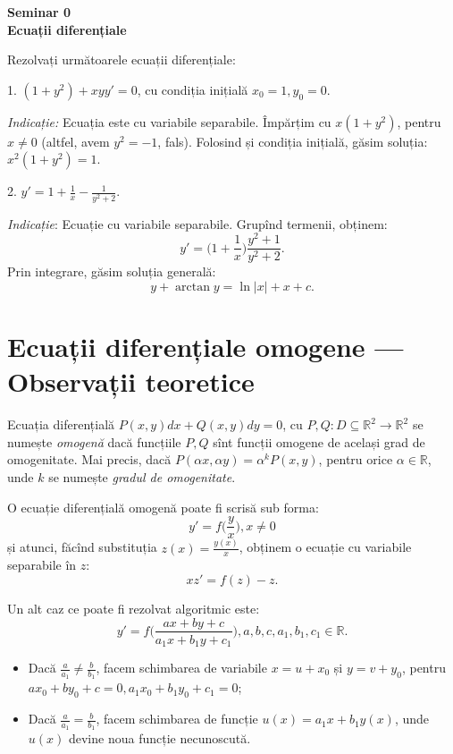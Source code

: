 \documentclass[11pt,a4paper]{article}
\newcommand\seq{\subseteq}
\newcommand\RR{\mathbb{R}}
\theoremstyle{dotless}
\theoremstyle{dotlessdr}
\begin{document}

\begin{center}
  {\large\textbf{Seminar 0 \\ Ecuații diferențiale}}
\end{center}

\vspace{2cm}

Rezolvați următoarele ecuații diferențiale:

1. $(1 + y^2) + xyy' = 0$, cu condiția inițială $x_0 = 1, y_0 = 0$.

\emph{Indicație:} Ecuația este cu variabile separabile. Împărțim cu
$x(1 + y^2)$, pentru $x \neq 0$ (altfel, avem $y^2 = -1$, fals).
Folosind și condiția inițială, găsim soluția: $x^2(1 + y^2) = 1$.

\vspace{1cm}

2. $y' = 1 + \frac{1}{x} - \frac{1}{y^2 + 2}$.

\emph{Indicație}: Ecuație cu variabile separabile. Grupînd termenii, obținem:
\[
  y' = \big(1 + \frac{1}{x}\big) \frac{y^2 + 1}{y^2 + 2}.
\]
Prin integrare, găsim soluția generală:
\[
  y + \arctan y = \ln|x| + x + c.
\]

\vspace{1cm}

\section*{Ecuații diferențiale omogene --- Observații teoretice}

Ecuația diferențială $P(x, y) dx + Q(x, y) dy = 0$, cu $P, Q : D \seq \RR^2 \to \RR^2$
se numește \emph{omogenă} dacă funcțiile $P, Q$ sînt funcții omogene de același grad
de omogenitate. Mai precis, dacă $P(\alpha x, \alpha y) = \alpha^k P(x, y)$, pentru
orice $\alpha \in \RR$, unde $k$ se numește \emph{gradul de omogenitate}.

O ecuație diferențială omogenă poate fi scrisă sub forma:
\[
  y' = f\big( \frac{y}{x} \big), x \neq 0
\]
și atunci, făcînd substituția $z(x) = \frac{y(x)}{x}$, obținem o ecuație cu variabile
separabile în $z$:
\[
  xz' = f(z) - z.
\]

Un alt caz ce poate fi rezolvat algoritmic este:
\[
  y' = f \Big( \frac{ax + by + c}{a_1 x + b_1 y + c_1} \Big), a, b, c, a_1, b_1, c_1 \in \RR.
\]
\begin{itemize}
\item Dacă $\frac{a}{a_1} \neq \frac{b}{b_1}$, facem schimbarea de variabile $x = u + x_0$
  și $y = v + y_0$, pentru $ax_0 + by_0 + c = 0, a_1 x_0 + b_1y_0 + c_1 = 0$;
\item Dacă $\frac{a}{a_1} = \frac{b}{b_1}$, facem schimbarea de funcție $u(x) = a_1 x + b_1y(x)$,
  unde $u(x)$ devine noua funcție necunoscută.
\end{itemize}
\end{document}
